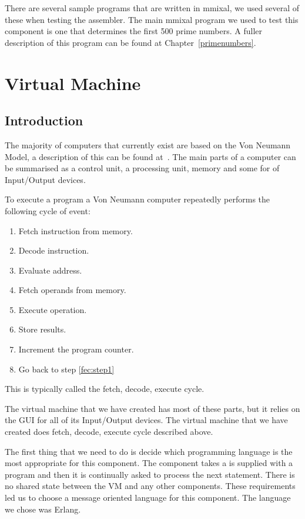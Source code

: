 \documentclass[a4paper,11pt]{report}
\begin{document}
There are several sample programs that are written in mmixal, we used several of these when testing the assembler. The main mmixal program we used to test this component is one that determines the first 500 prime numbers. A fuller description of this program can be found at Chapter~\ref{primenumbers}.
\chapter{Virtual Machine}\label{VM}
\section{Introduction}
The majority of computers that currently exist are based on the Von Neumann Model, a description of this can be found at~\cite{vnmodel}. The main parts of a computer can be summarised as a control unit, a processing unit, memory and some for of Input/Output devices.

To execute a program a Von Neumann computer repeatedly performs the following cycle of event:
\begin{enumerate}
\item Fetch instruction from memory.\label{fec:step1}
\item Decode instruction.
\item Evaluate address.
\item Fetch operands from memory.
\item Execute operation.
\item Store results.
\item Increment the program counter.
\item Go back to step \ref{fec:step1}
\end{enumerate}

This is typically called the fetch, decode, execute cycle.

The virtual machine that we have created has most of these parts, but it relies on the GUI for all of its Input/Output devices. The virtual machine that we have created does fetch, decode, execute cycle described above.

The first thing that we need to do is decide which programming language is the most appropriate for this component. The component takes a is supplied with a program and then it is continually asked to process the next statement. There is no shared state between the VM and any other components. These requirements led us to choose a message oriented language for this component. The language we chose was Erlang.
\end{document}
